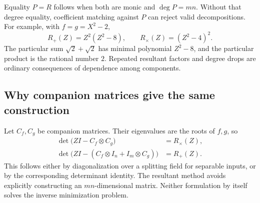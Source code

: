 \documentclass[11pt,a4paper]{article}
\theoremstyle{definition}
\theoremstyle{remark}
\begin{document}
Equality $P=R$ follows when both are monic and $\deg P=mn$. Without that degree equality, coefficient matching against $P$ can reject valid decompositions. For example, with $f=g=X^2-2$,
\[
 R_+(Z)=Z^2(Z^2-8),\qquad
 R_{\times}(Z)=(Z^2-4)^2.
\]
The particular sum $\sqrt2+\sqrt2$ has minimal polynomial $Z^2-8$, and the particular product is the rational number $2$. Repeated resultant factors and degree drops are ordinary consequences of dependence among components.

\subsection{Why companion matrices give the same construction}
Let $C_f,C_g$ be companion matrices. Their eigenvalues are the roots of $f,g$, so
\begin{align*}
 \det\bigl(ZI-C_f\otimes C_g\bigr)&=R_{\times}(Z),\\
 \det\bigl(ZI-(C_f\otimes I_n+I_m\otimes C_g)\bigr)&=R_+(Z).
\end{align*}
This follows either by diagonalization over a splitting field for separable inputs, or by the corresponding determinant identity. The resultant method avoids explicitly constructing an $mn$-dimensional matrix. Neither formulation by itself solves the inverse minimization problem.
\end{document}
